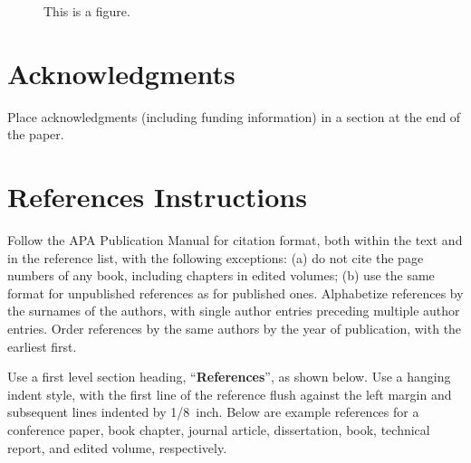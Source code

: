 \documentclass[10pt,letterpaper]{article}
\begin{document}
\begin{figure}[ht]
\begin{center}
\end{center}
\caption{This is a figure.} 
\label{sample-figure}
\end{figure}


\section{Acknowledgments}

Place acknowledgments (including funding information) in a section at
the end of the paper.


\section{References Instructions}

Follow the APA Publication Manual for citation format, both within the
text and in the reference list, with the following exceptions: (a) do
not cite the page numbers of any book, including chapters in edited
volumes; (b) use the same format for unpublished references as for
published ones. Alphabetize references by the surnames of the authors,
with single author entries preceding multiple author entries. Order
references by the same authors by the year of publication, with the
earliest first.

Use a first level section heading, ``{\bf References}'', as shown
below. Use a hanging indent style, with the first line of the
reference flush against the left margin and subsequent lines indented
by 1/8~inch. Below are example references for a conference paper, book
chapter, journal article, dissertation, book, technical report, and
edited volume, respectively.


\setlength{\bibleftmargin}{.125in}
\setlength{\bibindent}{-\bibleftmargin}

\end{document}

